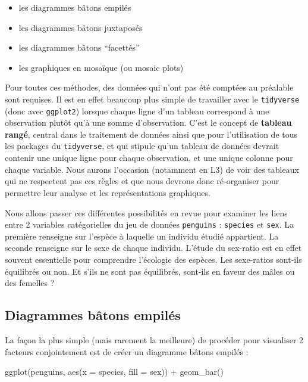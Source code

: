 \documentclass[
  a4paper,
  DIV=11,
  numbers=noendperiod,
  oneside]{scrreprt}
\newenvironment{Shaded}{}{}
\newcommand{\AttributeTok}[1]{\textcolor[rgb]{0.84,0.23,0.29}{#1}}
\newcommand{\FunctionTok}[1]{\textcolor[rgb]{0.44,0.26,0.76}{#1}}
\newcommand{\NormalTok}[1]{\textcolor[rgb]{0.14,0.16,0.18}{#1}}
\newcommand{\SpecialCharTok}[1]{\textcolor[rgb]{0.00,0.36,0.77}{#1}}
\providecommand{\tightlist}{%
  \setlength{\itemsep}{0pt}\setlength{\parskip}{0pt}}\usepackage{longtable,booktabs,array}
\begin{document}
\begin{itemize}
\tightlist
\item
  les diagrammes bâtons empilés
\item
  les diagrammes bâtons juxtaposés
\item
  les diagrammes bâtons ``facettés''
\item
  les graphiques en mosaïque (ou mosaic plots)
\end{itemize}

Pour toutes ces méthodes, des données qui n'ont pas été comptées au
préalable sont requises. Il est en effet beaucoup plus simple de
travailler avec le \texttt{tidyverse} (donc avec \texttt{ggplot2})
lorsque chaque ligne d'un tableau correspond à une observation plutôt
qu'à une somme d'observation. C'est le concept de \textbf{tableau
rangé}, central dans le traitement de données ainsi que pour
l'utilisation de tous les packages du \texttt{tidyverse}, et qui stipule
qu'un tableau de données devrait contenir une unique ligne pour chaque
observation, et une unique colonne pour chaque variable. Nous aurons
l'occasion (notamment en L3) de voir des tableaux qui ne respectent pas
ces règles et que nous devrons donc ré-organiser pour permettre leur
analyse et les représentations graphiques.

Nous allons passer ces différentes possibilités en revue pour examiner
les liens entre 2 variables catégorielles du jeu de données
\texttt{penguins} : \texttt{species} et \texttt{sex}. La première
renseigne sur l'espèce à laquelle un individu étudié appartient. La
seconde renseigne sur le sexe de chaque individu. L'étude du sex-ratio
est en effet souvent essentielle pour comprendre l'écologie des espèces.
Les sexe-ratios sont-ils équilibrés ou non. Et s'ils ne sont pas
équilibrés, sont-ils en faveur des mâles ou des femelles ?

\subsection{Diagrammes bâtons empilés}\label{sec-empil}

La façon la plus simple (mais rarement la meilleure) de procéder pour
visualiser 2 facteurs conjointement est de créer un diagramme bâtons
empilés :

\begin{Shaded}
\begin{Highlighting}[]
\FunctionTok{ggplot}\NormalTok{(penguins, }\FunctionTok{aes}\NormalTok{(}\AttributeTok{x =}\NormalTok{ species, }\AttributeTok{fill =}\NormalTok{ sex)) }\SpecialCharTok{+}
  \FunctionTok{geom\_bar}\NormalTok{()}
\end{Highlighting}
\end{Shaded}
\end{document}
